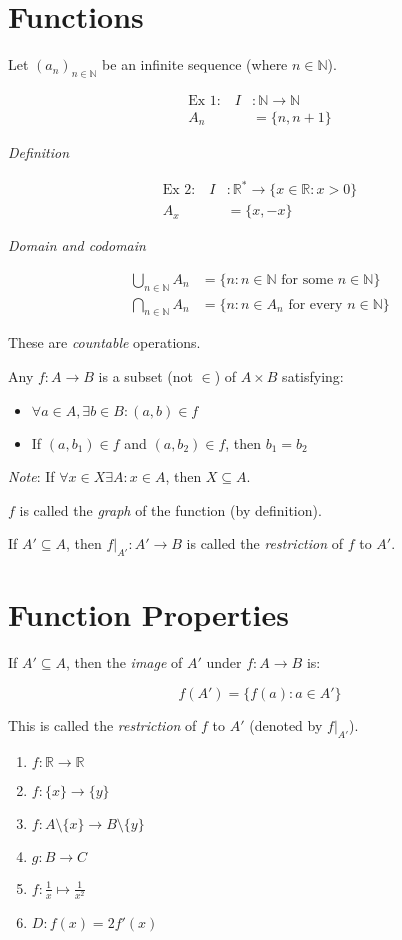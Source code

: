 \documentclass[12pt,a4paper]{article}
\begin{document}
\section{Functions}

Let $(a_n)_{n \in \mathbb{N}}$ be an infinite sequence (where $n \in \mathbb{N}$).

\begin{align*}
\text{Ex 1:} \quad I &: \mathbb{N} \to \mathbb{N} \\
A_n &= \{n, n+1\}
\end{align*}

\textit{Definition}

\begin{align*}
\text{Ex 2:} \quad I &: \mathbb{R}^* \to \{x \in \mathbb{R} : x > 0\} \\
A_x &= \{x, -x\}
\end{align*}

\textit{Domain and codomain}

\begin{align*}
\bigcup_{n \in \mathbb{N}} A_n &= \{n : n \in \mathbb{N} \text{ for some } n \in \mathbb{N}\} \\
\bigcap_{n \in \mathbb{N}} A_n &= \{n : n \in A_n \text{ for every } n \in \mathbb{N}\}
\end{align*}

These are \textit{countable} operations.

Any $f: A \to B$ is a subset (not $\in$) of $A \times B$ satisfying:
\begin{itemize}
\item $\forall a \in A, \exists b \in B : (a,b) \in f$
\item If $(a,b_1) \in f$ and $(a,b_2) \in f$, then $b_1 = b_2$
\end{itemize}

\textit{Note}: If $\forall x \in X \exists A : x \in A$, then $X \subseteq A$.

$f$ is called the \textit{graph} of the function (by definition).

If $A' \subseteq A$, then $f|_{A'} : A' \to B$ is called the \textit{restriction} of $f$ to $A'$.

\section{Function Properties}

If $A' \subseteq A$, then the \textit{image} of $A'$ under $f : A \to B$ is:

\[
f(A') = \{f(a) : a \in A'\}
\]

This is called the \textit{restriction} of $f$ to $A'$ (denoted by $f|_{A'}$).

\begin{enumerate}
\item $f: \mathbb{R} \to \mathbb{R}$
\item $f: \{x\} \to \{y\}$
\item $f: A \setminus \{x\} \to B \setminus \{y\}$
\item $g: B \to C$
\item $f: \frac{1}{x} \mapsto \frac{1}{x^2}$
\item $D: f(x) = 2f'(x)$
\end{enumerate}
\end{document}
